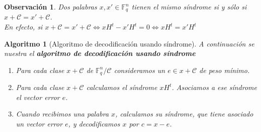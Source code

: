 \documentclass[spanish]{book}
\newtheorem{alg}{Algoritmo}
\newtheorem{obsv}{Observación}
\begin{document}
\begin{obsv}
	Dos palabras $x, x' \in \mathbb{F}_q^n$ tienen el mismo síndrome si y sólo si $x + \mathcal{C}=x'+\mathcal{C}$. \\
	En efecto, si $x+\mathcal{C}=x'+\mathcal{C} \Longleftrightarrow xH^t-x'H^t=0 \Longleftrightarrow xH^t=x'H^t$
\end{obsv}

\begin{alg}[Algoritmo de decodificación usando síndrome]
	A continuación se nuestra el \textbf{algoritmo de decodificación usando síndrome}
	\begin{enumerate}
		\item Para cada clase $x+\mathcal{C}$ de $\mathbb{F}_q^n/\mathcal{C}$ consideramos un $e \in x+\mathcal{C}$ de peso mínimo.
		\item Para cada clase $x+\mathcal{C}$ calculamos el síndrome $xH^t$. Asociamos a ese síndrome el vector error $e$.
		\item Cuando recibimos una palabra $x$, calculamos su síndrome, que tiene asociado un vector error $e$, y decodificamos $x$ por $c=x-e$.
	\end{enumerate}
\end{alg}
\end{document}
